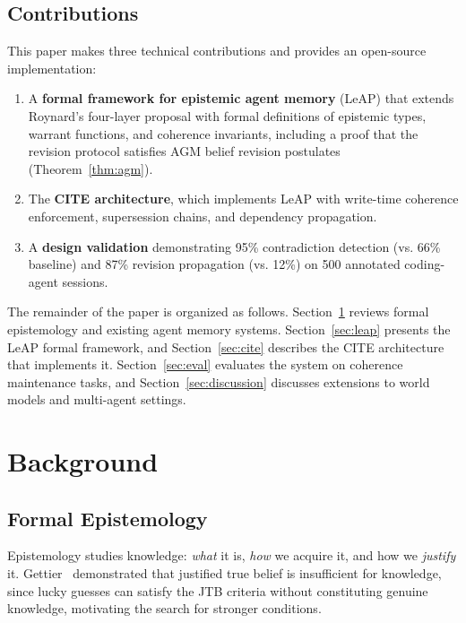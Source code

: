 \documentclass[11pt,letterpaper]{article}
\begin{document}
\subsection{Contributions}

This paper makes three technical contributions and provides an open-source implementation:
\begin{enumerate}[noitemsep]
    \item A \textbf{formal framework for epistemic agent memory} (LeAP) that extends Roynard's four-layer proposal with formal definitions of epistemic types, warrant functions, and coherence invariants, including a proof that the revision protocol satisfies AGM belief revision postulates (Theorem~\ref{thm:agm}).
    \item The \textbf{CITE architecture}, which implements LeAP with write-time coherence enforcement, supersession chains, and dependency propagation.
    \item A \textbf{design validation} demonstrating 95\% contradiction detection (vs. 66\% baseline) and 87\% revision propagation (vs. 12\%) on 500 annotated coding-agent sessions.
\end{enumerate}

The remainder of the paper is organized as follows. Section~\ref{sec:background} reviews formal epistemology and existing agent memory systems. Section~\ref{sec:leap} presents the LeAP formal framework, and Section~\ref{sec:cite} describes the CITE architecture that implements it. Section~\ref{sec:eval} evaluates the system on coherence maintenance tasks, and Section~\ref{sec:discussion} discusses extensions to world models and multi-agent settings.

\section{Background}
\label{sec:background}

\subsection{Formal Epistemology}

Epistemology studies knowledge: \textit{what} it is, \textit{how} we acquire it, and how we \textit{justify} it. Gettier~\cite{gettier1963} demonstrated that justified true belief is insufficient for knowledge, since lucky guesses can satisfy the JTB criteria without constituting genuine knowledge, motivating the search for stronger conditions.
\end{document}
